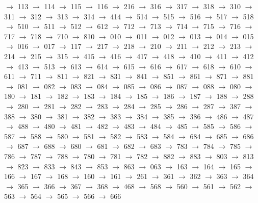 $\rightarrow$ 113 $\rightarrow$ 114 $\rightarrow$ 115 $\rightarrow$ 116 $\rightarrow$ 216 $\rightarrow$ 316 $\rightarrow$ 317 $\rightarrow$ 318 $\rightarrow$ 310 $\rightarrow$ 311 $\rightarrow$ 312 $\rightarrow$ 313 $\rightarrow$ 314 $\rightarrow$ 414 $\rightarrow$ 514 $\rightarrow$ 515 $\rightarrow$ 516 $\rightarrow$ 517 $\rightarrow$ 518 $\rightarrow$ 510 $\rightarrow$ 511 $\rightarrow$ 512 $\rightarrow$ 612 $\rightarrow$ 712 $\rightarrow$ 713 $\rightarrow$ 714 $\rightarrow$ 715 $\rightarrow$ 716 $\rightarrow$ 717 $\rightarrow$ 718 $\rightarrow$ 710 $\rightarrow$ 810 $\rightarrow$ 010 $\rightarrow$ 011 $\rightarrow$ 012 $\rightarrow$ 013 $\rightarrow$ 014 $\rightarrow$ 015 $\rightarrow$ 016 $\rightarrow$ 017 $\rightarrow$ 117 $\rightarrow$ 217 $\rightarrow$ 218 $\rightarrow$ 210 $\rightarrow$ 211 $\rightarrow$ 212 $\rightarrow$ 213 $\rightarrow$ 214 $\rightarrow$ 215 $\rightarrow$ 315 $\rightarrow$ 415 $\rightarrow$ 416 $\rightarrow$ 417 $\rightarrow$ 418 $\rightarrow$ 410 $\rightarrow$ 411 $\rightarrow$ 412 $\rightarrow$ 413 $\rightarrow$ 513 $\rightarrow$ 613 $\rightarrow$ 614 $\rightarrow$ 615 $\rightarrow$ 616 $\rightarrow$ 617 $\rightarrow$ 618 $\rightarrow$ 610 $\rightarrow$ 611 $\rightarrow$ 711 $\rightarrow$ 811 $\rightarrow$ 821 $\rightarrow$ 831 $\rightarrow$ 841 $\rightarrow$ 851 $\rightarrow$ 861 $\rightarrow$ 871 $\rightarrow$ 881 $\rightarrow$ 081 $\rightarrow$ 082 $\rightarrow$ 083 $\rightarrow$ 084 $\rightarrow$ 085 $\rightarrow$ 086 $\rightarrow$ 087 $\rightarrow$ 088 $\rightarrow$ 080 $\rightarrow$ 180 $\rightarrow$ 181 $\rightarrow$ 182 $\rightarrow$ 183 $\rightarrow$ 184 $\rightarrow$ 185 $\rightarrow$ 186 $\rightarrow$ 187 $\rightarrow$ 188 $\rightarrow$ 288 $\rightarrow$ 280 $\rightarrow$ 281 $\rightarrow$ 282 $\rightarrow$ 283 $\rightarrow$ 284 $\rightarrow$ 285 $\rightarrow$ 286 $\rightarrow$ 287 $\rightarrow$ 387 $\rightarrow$ 388 $\rightarrow$ 380 $\rightarrow$ 381 $\rightarrow$ 382 $\rightarrow$ 383 $\rightarrow$ 384 $\rightarrow$ 385 $\rightarrow$ 386 $\rightarrow$ 486 $\rightarrow$ 487 $\rightarrow$ 488 $\rightarrow$ 480 $\rightarrow$ 481 $\rightarrow$ 482 $\rightarrow$ 483 $\rightarrow$ 484 $\rightarrow$ 485 $\rightarrow$ 585 $\rightarrow$ 586 $\rightarrow$ 587 $\rightarrow$ 588 $\rightarrow$ 580 $\rightarrow$ 581 $\rightarrow$ 582 $\rightarrow$ 583 $\rightarrow$ 584 $\rightarrow$ 684 $\rightarrow$ 685 $\rightarrow$ 686 $\rightarrow$ 687 $\rightarrow$ 688 $\rightarrow$ 680 $\rightarrow$ 681 $\rightarrow$ 682 $\rightarrow$ 683 $\rightarrow$ 783 $\rightarrow$ 784 $\rightarrow$ 785 $\rightarrow$ 786 $\rightarrow$ 787 $\rightarrow$ 788 $\rightarrow$ 780 $\rightarrow$ 781 $\rightarrow$ 782 $\rightarrow$ 882 $\rightarrow$ 883 $\rightarrow$ 803 $\rightarrow$ 813 $\rightarrow$ 823 $\rightarrow$ 833 $\rightarrow$ 843 $\rightarrow$ 853 $\rightarrow$ 863 $\rightarrow$ 063 $\rightarrow$ 163 $\rightarrow$ 164 $\rightarrow$ 165 $\rightarrow$ 166 $\rightarrow$ 167 $\rightarrow$ 168 $\rightarrow$ 160 $\rightarrow$ 161 $\rightarrow$ 261 $\rightarrow$ 361 $\rightarrow$ 362 $\rightarrow$ 363 $\rightarrow$ 364 $\rightarrow$ 365 $\rightarrow$ 366 $\rightarrow$ 367 $\rightarrow$ 368 $\rightarrow$ 468 $\rightarrow$ 568 $\rightarrow$ 560 $\rightarrow$ 561 $\rightarrow$ 562 $\rightarrow$ 563 $\rightarrow$ 564 $\rightarrow$ 565 $\rightarrow$ 566 $\rightarrow$ 666 